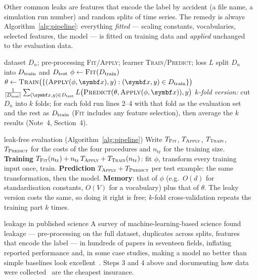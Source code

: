 \documentclass[11pt]{article}
\begin{document}
Other common leaks are features that encode the label by accident (a file name, a simulation run number) and random
splits of time series. The remedy is always
Algorithm~\ref{alg:pipeline}: everything \emph{fitted} --- scaling constants, vocabularies, selected features, the
model --- is fitted on training data and \emph{applied} unchanged to the evaluation data.

\begin{algorithm}[htbp]
\caption{Leak-free hold-out evaluation of a pipeline}\label{alg:pipeline}
\begin{algorithmic}[1]
\Require dataset $D_n$; pre-processing \textsc{Fit}/\textsc{Apply}; learner \textsc{Train}/\textsc{Predict}; loss $L$
\State split $D_n$ into $D_{\mathrm{train}}$ and $D_{\mathrm{test}}$ 
\State $\phi \gets \textsc{Fit}(D_{\mathrm{train}})$ 
\State $\theta \gets \textsc{Train}\big(\{(\textsc{Apply}(\phi, \x), y) : (\x, y) \in \Dtrain\}\big)$
\State \Return $\frac{1}{|\Dtest|} \sum_{(\x, y) \in \Dtest} L\big(\textsc{Predict}(\theta, \textsc{Apply}(\phi, \x)), y\big)$
\Statex \textit{$k$-fold version:} cut $D_n$ into $k$ folds; for each fold run lines 2--4 with that fold as the
evaluation set and the rest as $D_{\mathrm{train}}$ (\textsc{Fit} includes any feature selection), then average the $k$ results
(Note~4, Section~4).
\end{algorithmic}
\end{algorithm}

\begin{runtime}{leak-free evaluation (Algorithm~\ref{alg:pipeline})}
Write $T_{\textsc{Fit}}$, $T_{\textsc{Apply}}$, $T_{\textsc{Train}}$, $T_{\textsc{Predict}}$ for the costs of the four
procedures and $n_{\mathrm{tr}}$ for the training size. \textbf{Training}
$T_{\textsc{Fit}}(n_{\mathrm{tr}}) + n_{\mathrm{tr}}\, T_{\textsc{Apply}} + T_{\textsc{Train}}(n_{\mathrm{tr}})$: fit
$\phi$, transform every training input once, train. \textbf{Prediction} $T_{\textsc{Apply}} + T_{\textsc{Predict}}$ per
test example: the same transformation, then the model. \textbf{Memory}: that of $\phi$ (e.g.\ $O(d)$ for
standardisation constants, $O(V)$ for a vocabulary) plus that of $\theta$. The leaky version costs the same, so doing
it right is free; $k$-fold cross-validation repeats the training part $k$ times.
\end{runtime}

\begin{modern}{leakage in published science}
A survey of machine-learning-based science found leakage --- pre-processing on the full dataset, duplicates across
splits, features that encode the label --- in hundreds of papers in seventeen fields, inflating reported performance
and, in some case studies, making a model no better than simple baselines look excellent~\cite{kapoor2023}. Steps 3
and 4 above and documenting how data were collected~\cite{gebru2021} are the cheapest insurance.
\end{modern}
\end{document}
